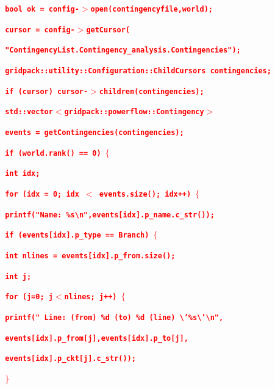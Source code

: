 \documentclass[12pt]{report} %
\begin{document}
\textcolor{red}{\texttt{\textbf{  bool ok = config-$\boldsymbol{\mathrm{>}}$open(contingencyfile,world);}}}

\textcolor{red}{\texttt{\textbf{  cursor = config-$\boldsymbol{\mathrm{>}}$getCursor(}}}

\textcolor{red}{\texttt{\textbf{      "ContingencyList.Contingency\_analysis.Contingencies");}}}

\textcolor{red}{\texttt{\textbf{  gridpack::utility::Configuration::ChildCursors contingencies;}}}

\textcolor{red}{\texttt{\textbf{  if (cursor) cursor-$\boldsymbol{\mathrm{>}}$children(contingencies);}}}

\textcolor{red}{\texttt{\textbf{  std::vector$\boldsymbol{\mathrm{<}}$gridpack::powerflow::Contingency$\boldsymbol{\mathrm{>}}$}}}

\textcolor{red}{\texttt{\textbf{    events = getContingencies(contingencies);}}}

\textcolor{red}{\texttt{\textbf{  if (world.rank() == 0) $\boldsymbol{\mathrm{\{}}$}}}

\textcolor{red}{\texttt{\textbf{    int idx;}}}

\textcolor{red}{\texttt{\textbf{    for (idx = 0; idx $\boldsymbol{\mathrm{<}}$ events.size(); idx++) $\boldsymbol{\mathrm{\{}}$}}}

\textcolor{red}{\texttt{\textbf{      printf("Name: \%s{\textbackslash}n",events[idx].p\_name.c\_str());}}}

\textcolor{red}{\texttt{\textbf{      if (events[idx].p\_type == Branch) $\boldsymbol{\mathrm{\{}}$}}}

\textcolor{red}{\texttt{\textbf{        int nlines = events[idx].p\_from.size();}}}

\textcolor{red}{\texttt{\textbf{        int j;}}}

\textcolor{red}{\texttt{\textbf{        for (j=0; j$\boldsymbol{\mathrm{<}}$nlines; j++) $\boldsymbol{\mathrm{\{}}$}}}

\textcolor{red}{\texttt{\textbf{          printf(" Line: (from) \%d (to) \%d (line) {\textbackslash}'\%s{\textbackslash}'{\textbackslash}n",}}}

\textcolor{red}{\texttt{\textbf{              events[idx].p\_from[j],events[idx].p\_to[j],}}}

\textcolor{red}{\texttt{\textbf{              events[idx].p\_ckt[j].c\_str());}}}

\textcolor{red}{\texttt{\textbf{        $\boldsymbol{\mathrm{\}}}$}}}
\end{document}
